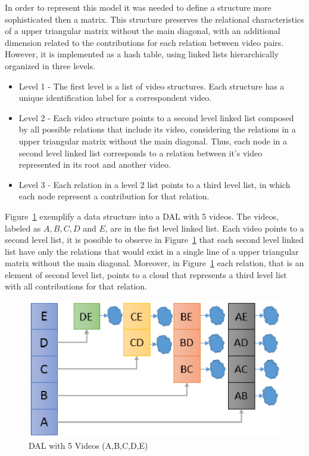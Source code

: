 In order to represent this model it was needed to define a structure more sophisticated then a matrix. This structure preserves the relational characteristics of a upper triangular matrix without the main diagonal, with an additional dimension related to the contributions for each relation between video pairs. However, it is implemented as a hash table, using linked lists hierarchically organized in three levels. 

\begin{itemize}

\item Level 1 - The first level is a list of video structures. Each structure has a unique identification label for a correspondent video. 

\item Level 2 - Each video structure points to a second level linked list composed by all possible relations that include its video, considering the relations in a upper triangular matrix without the main diagonal.  Thus, each node in a second level linked list corresponds to a relation between it's video represented in its root and another video.

\item Level 3 - Each relation in a level 2 list points to a third level list, in which each node represent a contribution for that relation.

\end{itemize}

Figure~\ref{dal} exemplify a data structure into a DAL with 5 videos. The videos, labeled as $A, B, C, D$  and $E$, are in the fist level linked list. Each video points to a second level list, it is possible to observe in Figure~\ref{dal}  that each second level linked list have only the relations that would exist in a single line of a upper triangular matrix without the main diagonal. Moreover, in Figure~\ref{dal} each relation, that is an element of second level list, points to a cloud that represents a third level list with all contributions for that relation.

\begin{figure}
	\centering
	\includegraphics[scale=0.8]{figures/dal}
	\caption{DAL with 5 Videos (A,B,C,D,E)}
	\label{dal}
\end{figure}

